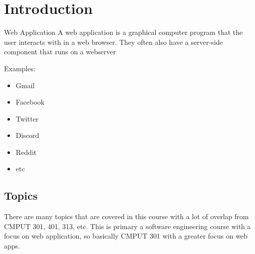 \documentclass[../CMPUT-404-Notes.tex]{subfiles}
\begin{document}
\chapter{Introduction}
\begin{Definition}
  {Web Application}
  A web application is a graphical computer program that the user interacts with in a web browser. They often also have a server-side component that runs on a webserver

  Examples: 
  \begin{itemize}
    \item Gmail
    \item Facebook
    \item Twitter
    \item Discord
    \item Reddit
    \item etc
  \end{itemize}
  
\end{Definition}

\section{Topics}
There are many topics that are covered in this course with a lot of overlap from CMPUT 301, 401, 313, etc.
This is primary a software engineering course with a focus on web application, so basically CMPUT 301 with a greater focus on web apps.
\end{document}
